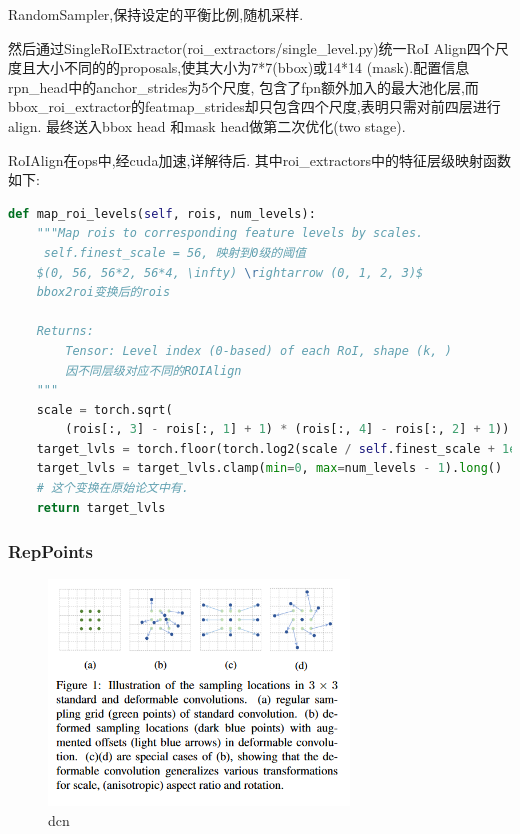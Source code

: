 \documentclass[UTF8]{ctexart}
\begin{document}
RandomSampler,保持设定的平衡比例,随机采样.

然后通过SingleRoIExtractor(roi\_extractors/single\_level.py)统一RoI
Align四个尺度且大小不同的的proposals,使其大小为7*7(bbox)或14*14
(mask).配置信息rpn\_head中的anchor\_strides为5个尺度,
包含了fpn额外加入的最大池化层,而bbox\_roi\_extractor的featmap\_strides却只包含四个尺度,表明只需对前四层进行align.
最终送入bbox head 和mask head做第二次优化(two stage).

RoIAlign在ops中,经cuda加速,详解待后.
其中roi\_extractors中的特征层级映射函数如下:
\lstset{style=mystyle}
\begin{lstlisting}[language=Python]
	def map_roi_levels(self, rois, num_levels):
	"""Map rois to corresponding feature levels by scales.
	 self.finest_scale = 56, 映射到0级的阈值
	$(0, 56, 56*2, 56*4, \infty) \rightarrow (0, 1, 2, 3)$
	bbox2roi变换后的rois

	Returns:
		Tensor: Level index (0-based) of each RoI, shape (k, )
		因不同层级对应不同的ROIAlign
	"""
	scale = torch.sqrt(
		(rois[:, 3] - rois[:, 1] + 1) * (rois[:, 4] - rois[:, 2] + 1))
	target_lvls = torch.floor(torch.log2(scale / self.finest_scale + 1e-6))
	target_lvls = target_lvls.clamp(min=0, max=num_levels - 1).long()
	# 这个变换在原始论文中有.
	return target_lvls
\end{lstlisting}

\subsubsection{RepPoints}

\begin{figure}[htbp]
	\centering
	\begin{minipage}[t]{0.9\textwidth}
	\centering
	\includegraphics[width=8cm, height=6cm]{./pic/DCN.png}
	\caption{dcn}
	\label{picdcn}
	\end{minipage}
\end{figure}
\end{document}
